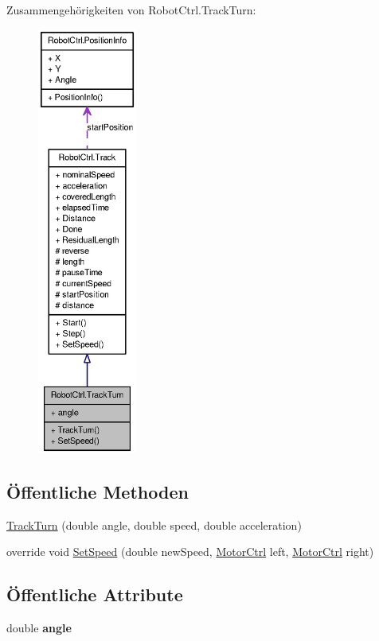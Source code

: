 Zusammengehörigkeiten von RobotCtrl.TrackTurn:\nopagebreak
\begin{figure}[H]
\begin{center}
\leavevmode
\includegraphics[height=400pt]{class_robot_ctrl_1_1_track_turn__coll__graph}
\end{center}
\end{figure}
\subsection*{Öffentliche Methoden}
\begin{DoxyCompactItemize}
\item 
\hyperlink{class_robot_ctrl_1_1_track_turn_a734b50f5f72a3521d15855b0f86d2c6c}{TrackTurn} (double angle, double speed, double acceleration)
\item 
override void \hyperlink{class_robot_ctrl_1_1_track_turn_a065e23cd313e746cb65496c9b9df0955}{SetSpeed} (double newSpeed, \hyperlink{class_robot_ctrl_1_1_motor_ctrl}{MotorCtrl} left, \hyperlink{class_robot_ctrl_1_1_motor_ctrl}{MotorCtrl} right)
\end{DoxyCompactItemize}
\subsection*{Öffentliche Attribute}
\begin{DoxyCompactItemize}
\item 
\hypertarget{class_robot_ctrl_1_1_track_turn_a5ea004969a5701516952d1424dfa2be3}{
double {\bfseries angle}}
\label{class_robot_ctrl_1_1_track_turn_a5ea004969a5701516952d1424dfa2be3}

\end{DoxyCompactItemize}


